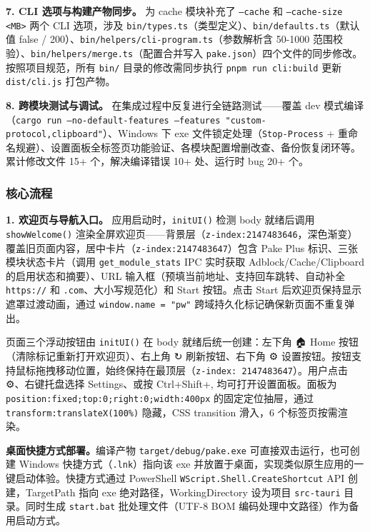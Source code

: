 \documentclass[12pt,a4paper]{ctexart}
\begin{document}
\textbf{7. CLI 选项与构建产物同步。}
为 cache 模块补充了 \texttt{--cache} 和 \texttt{--cache-size <MB>} 两个 CLI 选项，涉及 \texttt{bin/types.ts}（类型定义）、\texttt{bin/defaults.ts}（默认值 false / 200）、\texttt{bin/helpers/cli-program.ts}（参数解析含 50-1000 范围校验）、\texttt{bin/helpers/merge.ts}（配置合并写入 \texttt{pake.json}）四个文件的同步修改。按照项目规范，所有 \texttt{bin/} 目录的修改需同步执行 \texttt{pnpm run cli:build} 更新 \texttt{dist/cli.js} 打包产物。

\textbf{8. 跨模块测试与调试。}
在集成过程中反复进行全链路测试——覆盖 dev 模式编译（\texttt{cargo run --no-default-features --features "custom-protocol,clipboard"}）、Windows 下 exe 文件锁定处理（\texttt{Stop-Process} + 重命名规避）、设置面板全标签页功能验证、各模块配置增删改查、备份恢复闭环等。累计修改文件 15+ 个，解决编译错误 10+ 处、运行时 bug 20+ 个。

\subsubsection{核心流程}

\textbf{1. 欢迎页与导航入口。}
应用启动时，\texttt{initUI()} 检测 body 就绪后调用 \texttt{showWelcome()} 渲染全屏欢迎页——背景层（\texttt{z-index:2147483646}，深色渐变）覆盖旧页面内容，居中卡片（\texttt{z-index:2147483647}）包含 Pake Plus 标识、三张模块状态卡片（调用 \texttt{get\_module\_stats} IPC 实时获取 Adblock/Cache/Clipboard 的启用状态和摘要）、URL 输入框（预填当前地址、支持回车跳转、自动补全 \texttt{https://} 和 \texttt{.com}、大小写规范化）和 Start 按钮。点击 Start 后欢迎页保持显示遮罩过渡动画，通过 \texttt{window.name = "pw"} 跨域持久化标记确保新页面不重复弹出。

页面三个浮动按钮由 \texttt{initUI()} 在 body 就绪后统一创建：左下角 🏠 Home 按钮（清除标记重新打开欢迎页）、右上角 ↻ 刷新按钮、右下角 ⚙ 设置按钮。按钮支持鼠标拖拽移动位置，始终保持在最顶层（\texttt{z-index: 2147483647}）。用户点击 ⚙、右键托盘选择 Settings、或按 Ctrl+Shift+, 均可打开设置面板。面板为 \texttt{position:fixed;top:0;right:0;width:400px} 的固定定位抽屉，通过 \texttt{transform:translateX(100\%)} 隐藏，CSS transition 滑入，6 个标签页按需渲染。

\textbf{桌面快捷方式部署。}编译产物 \texttt{target/debug/pake.exe} 可直接双击运行，也可创建 Windows 快捷方式（\texttt{.lnk}）指向该 exe 并放置于桌面，实现类似原生应用的一键启动体验。快捷方式通过 PowerShell \texttt{WScript.Shell.CreateShortcut} API 创建，TargetPath 指向 exe 绝对路径，WorkingDirectory 设为项目 \texttt{src-tauri} 目录。同时生成 \texttt{start.bat} 批处理文件（UTF-8 BOM 编码处理中文路径）作为备用启动方式。
\end{document}

